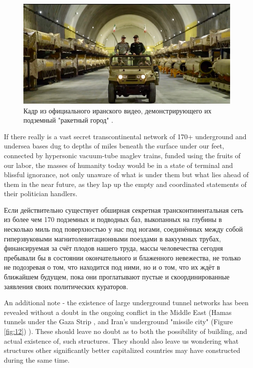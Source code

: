 \documentclass[10pt,twocolumn,letterpaper]{article}
\begin{document}
\begin{figure}[t]
\begin{center}
   \includegraphics[width=1\linewidth]{iran.jpeg}
\end{center}
   \caption{Кадр из официального иранского видео, демонстрирующего их подземный "ракетный город" \cite{39,40}.}
\label{fig:12}
\label{fig:onecol}
\end{figure}
If there really is a vast secret transcontinental network of 170+ underground and undersea bases dug to depths of miles beneath the surface under our feet, connected by hypersonic vacuum-tube maglev trains, funded using the fruits of our labor, the masses of humanity today would be in a state of terminal and blissful ignorance, not only unaware of what is under them but what lies ahead of them in the near future, as they lap up the empty and coordinated statements of their politician handlers.

Если действительно существует обширная секретная трансконтинентальная сеть из более чем 170 подземных и подводных баз, выкопанных на глубины в несколько миль под поверхностью у нас под ногами, соединённых между собой гиперзвуковыми магнитолевитационными поездами в вакуумных трубах, финансируемая за счёт плодов нашего труда, массы человечества сегодня пребывали бы в состоянии окончательного и блаженного невежества, не только не подозревая о том, что находится под ними, но и о том, что их ждёт в ближайшем будущем, пока они проглатывают пустые и скоординированные заявления своих политических кураторов.

An additional note - the existence of large underground tunnel networks has been revealed without a doubt in the ongoing conflict in the Middle East (Hamas tunnels under the Gaza Strip \cite{38}, and Iran's underground "missile city" (Figure \ref{fig:12}) \cite{39,40}). These should leave no doubt as to both the possibility of building, and actual existence of, such structures. They should also leave us wondering what structures other significantly better capitalized countries may have constructed during the same time.
\end{document}
